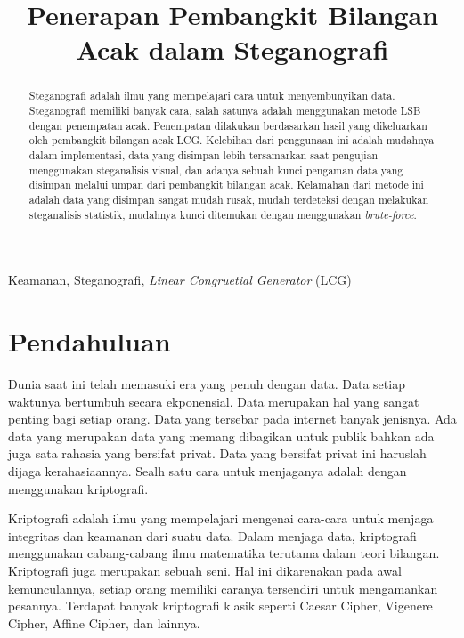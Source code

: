 \documentclass[10pt,conference]{IEEEtran}
\theoremstyle{definition}
\begin{document}
\title{Penerapan Pembangkit Bilangan Acak dalam Steganografi}

\author{
}

\maketitle

\begin{abstract}
Steganografi adalah ilmu yang mempelajari cara untuk menyembunyikan data. Steganografi memiliki banyak cara, salah satunya adalah menggunakan
metode LSB dengan penempatan acak. Penempatan dilakukan berdasarkan hasil yang dikeluarkan oleh pembangkit bilangan acak LCG. Kelebihan dari
penggunaan ini adalah mudahnya dalam implementasi, data yang disimpan lebih tersamarkan  saat pengujian menggunakan steganalisis visual,
dan adanya sebuah kunci pengaman data yang disimpan melalui umpan dari pembangkit bilangan acak. Kelamahan dari metode ini adalah data yang disimpan
sangat mudah rusak, mudah terdeteksi dengan melakukan steganalisis statistik, mudahnya kunci ditemukan dengan menggunakan \emph{brute-force}.
\end{abstract}

\begin{IEEEkeywords}
Keamanan, Steganografi, \emph{Linear Congruetial Generator} (LCG)
\end{IEEEkeywords}

\section{Pendahuluan}
Dunia saat ini telah memasuki era yang penuh dengan data. Data setiap waktunya bertumbuh secara ekponensial. 
Data merupakan hal yang sangat penting bagi setiap orang. Data yang tersebar pada internet banyak jenisnya. 
Ada data yang merupakan data yang memang dibagikan untuk publik bahkan ada juga sata rahasia yang bersifat privat. 
Data yang bersifat privat ini haruslah dijaga kerahasiaannya. Sealh satu cara untuk menjaganya adalah dengan menggunakan kriptografi.

Kriptografi adalah ilmu yang mempelajari mengenai cara-cara untuk menjaga integritas dan keamanan dari suatu data.\cite{b1}
Dalam menjaga data, kriptografi menggunakan cabang-cabang ilmu matematika terutama dalam teori bilangan. 
Kriptografi juga merupakan sebuah seni. Hal ini dikarenakan pada awal kemunculannya, setiap orang memiliki 
caranya tersendiri untuk mengamankan pesannya. Terdapat banyak kriptografi klasik seperti Caesar Cipher, 
Vigenere Cipher, Affine Cipher, dan lainnya.
\end{document}
